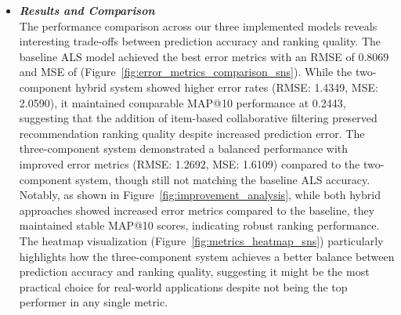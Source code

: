 \documentclass[9pt]{article}
\begin{document}
\begin{enumerate}
\begin{itemize}
\begin{figure}[H]
{            \label{fig:metric_correlation}
          }
      \end{figure}
      \item \textit{\textbf{Results and Comparison}}\\The performance comparison across our three implemented models reveals interesting trade-offs between prediction accuracy and ranking quality. The baseline ALS model achieved the best error metrics with an RMSE of 0.8069 and MSE of (Figure~\ref{fig:error_metrics_comparison_sns}). While the two-component hybrid system showed higher error rates (RMSE: 1.4349, MSE: 2.0590), it maintained comparable MAP@10 performance at 0.2443, suggesting that the addition of item-based collaborative filtering preserved recommendation ranking quality despite increased prediction error. The three-component system demonstrated a balanced performance with improved error metrics (RMSE: 1.2692, MSE: 1.6109) compared to the two-component system, though still not matching the baseline ALS accuracy. Notably, as shown in Figure~\ref{fig:improvement_analysis}, while both hybrid approaches showed increased error metrics compared to the baseline, they maintained stable MAP@10 scores, indicating robust ranking performance. The heatmap visualization (Figure~\ref{fig:metrics_heatmap_sns}) particularly highlights how the three-component system achieves a better balance between prediction accuracy and ranking quality, suggesting it might be the most practical choice for real-world applications despite not being the top performer in any single metric.
      \begin{figure}[H]
\end{figure}
\end{itemize}
\end{enumerate}
\end{document}
